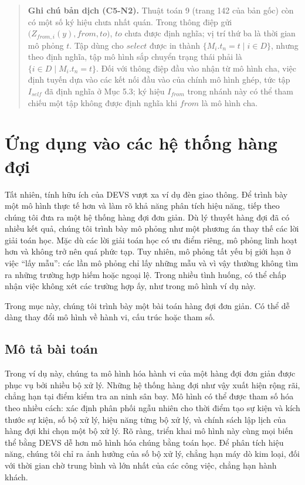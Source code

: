 \begin{quote}\small
\textbf{Ghi chú bản dịch (C5-N2).} Thuật toán 9 (trang 142 của bản gốc) còn có một số ký hiệu chưa nhất quán. Trong thông điệp gửi $\bigl(Z_{from,i}(y),from,to\bigr)$, $to$ chưa được định nghĩa; vị trí thứ ba là thời gian mô phỏng $t$. Tập dùng cho $select$ được in thành $\{M_i.t_n=t\mid i\in D\}$, nhưng theo định nghĩa, tập mô hình sắp chuyển trạng thái phải là $\{i\in D\mid M_i.t_n=t\}$. Đối với thông điệp đầu vào nhận từ mô hình cha, việc định tuyến dựa vào các kết nối đầu vào của chính mô hình ghép, tức tập $I_{self}$ đã định nghĩa ở Mục 5.3; ký hiệu $I_{from}$ trong nhánh này có thể tham chiếu một tập không được định nghĩa khi $from$ là mô hình cha.
\end{quote}

\section{Ứng dụng vào các hệ thống hàng đợi}
Tất nhiên, tính hữu ích của DEVS vượt xa ví dụ đèn giao thông. Để trình bày một mô hình thực tế hơn và làm rõ khả năng phân tích hiệu năng, tiếp theo chúng tôi đưa ra một hệ thống hàng đợi đơn giản. Dù lý thuyết hàng đợi đã có nhiều kết quả, chúng tôi trình bày mô phỏng như một phương án thay thế các lời giải toán học. Mặc dù các lời giải toán học có ưu điểm riêng, mô phỏng linh hoạt hơn và không trở nên quá phức tạp. Tuy nhiên, mô phỏng tất yếu bị giới hạn ở việc ``lấy mẫu'': các lần mô phỏng chỉ lấy những mẫu và vì vậy thường không tìm ra những trường hợp hiếm hoặc ngoại lệ. Trong nhiều tình huống, có thể chấp nhận việc không xét các trường hợp ấy, như trong mô hình ví dụ này.

Trong mục này, chúng tôi trình bày một bài toán hàng đợi đơn giản. Có thể dễ dàng thay đổi mô hình về hành vi, cấu trúc hoặc tham số.

\subsection{Mô tả bài toán}
Trong ví dụ này, chúng ta mô hình hóa hành vi của một hàng đợi đơn giản được phục vụ bởi nhiều bộ xử lý. Những hệ thống hàng đợi như vậy xuất hiện rộng rãi, chẳng hạn tại điểm kiểm tra an ninh sân bay. Mô hình có thể được tham số hóa theo nhiều cách: xác định phân phối ngẫu nhiên cho thời điểm tạo sự kiện và kích thước sự kiện, số bộ xử lý, hiệu năng từng bộ xử lý, và chính sách lập lịch của hàng đợi khi chọn một bộ xử lý. Rõ ràng, triển khai mô hình này cùng mọi biến thể bằng DEVS dễ hơn mô hình hóa chúng bằng toán học. Để phân tích hiệu năng, chúng tôi chỉ ra ảnh hưởng của số bộ xử lý, chẳng hạn máy dò kim loại, đối với thời gian chờ trung bình và lớn nhất của các công việc, chẳng hạn hành khách.

